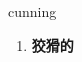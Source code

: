 
\begin{frame}
{\huge cunning}
\begin{center}
\begin{enumerate}\Large
  \item \textbf{狡猾的}
\end{enumerate}
\end{center}
\end{frame}
